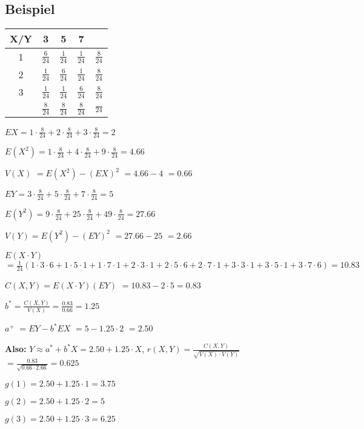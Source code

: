 \renewcommand{\ldate}{2015-12-15}

\subsection{Beispiel}

\begin{tabular}{|c|c|c|c|c|}
\hline X/Y & 3 & 5 & 7 &  \\ 
\hline 1 & $ \frac{6}{24} $ & $ \frac{1}{24} $ & $ \frac{1}{24} $ & $ \frac{8}{24} $ \\ 
\hline 2 & $ \frac{1}{24} $ & $ \frac{6}{24} $ & $ \frac{1}{24} $ & $ \frac{8}{24} $ \\ 
\hline 3 & $ \frac{1}{24} $ & $ \frac{1}{24} $ & $ \frac{6}{24} $ & $ \frac{8}{24} $ \\ 
\hline  & $ \frac{8}{24} $ & $ \frac{8}{24} $ & $ \frac{8}{24} $ & $ \frac{}{24} $ \\ 
\hline 
\end{tabular}  

$EX=1\cdot \frac{8}{24} + 2\cdot \frac{8}{24} + 3\cdot \frac{8}{24} = 2$

$E(X^2) = 1\cdot \frac{8}{24} + 4\cdot \frac{8}{24} + 9\cdot \frac{8}{24} = 4.66$

$V(X) $
$= E(X^2) - (EX)^2$
$=4.66 - 4$
$=0.66$

$EY = 3\cdot \frac{8}{24} + 5\cdot \frac{8}{24} + 7\cdot \frac{8}{24} = 5$

$E(Y^2) = 9\cdot \frac{8}{24} + 25\cdot \frac{8}{24} + 49\cdot \frac{8}{24} = 27.66$

$V(Y) = E(Y^2) - (EY)^2$
$=27.66 - 25$
$=2.66$

$E(X\cdot Y) $
$= \frac{1}{24} ( 1\cdot 3\cdot 6+1\cdot 5\cdot 1+1\cdot 7\cdot 1 + 2\cdot 3\cdot 1+2\cdot 5\cdot 6 +2\cdot 7\cdot 1+3\cdot 3\cdot 1+3\cdot 5\cdot 1 +3\cdot 7\cdot 6) = 10.83$ 

$C(X,Y) = E(X\cdot Y) (EY)$
$=10.83 -2\cdot 5 = 0.83$

$b^* = \frac{C(X,Y)}{V(X)} = \frac{0.83}{0.66} = 1.25$

$a^+ $
$= EY - b^* EX$
$=5-1.25\cdot 2$
$=2.50$

\textbf{Also:} $Y\approx a^* + b^* X = 2.50 + 1.25\cdot X$, $r(X,Y) = \frac{C(X,Y)}{\sqrt{V(X)\cdot V(Y)}}$
$=\frac{0.83}{\sqrt{0.66\cdot 2.66}} = 0.625$

$g(1)=2.50 + 1.25 \cdot 1 = 3.75$

$g(2)=2.50 + 1.25 \cdot 2 = 5$

$g(3)=2.50 + 1.25 \cdot 3 = 6.25$

